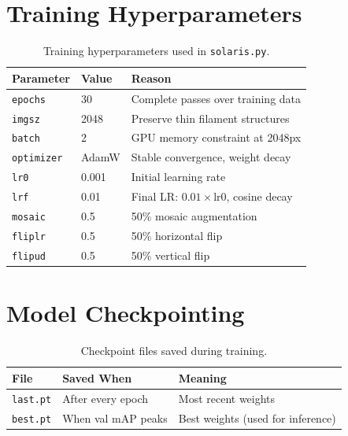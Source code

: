 \documentclass[12pt,a4paper,openany]{report}
\begin{document}
\section{Training Hyperparameters}

\begin{table}[H]
\centering
\caption{Training hyperparameters used in \texttt{solaris.py}.}
\renewcommand{\arraystretch}{1.3}
\begin{tabular}{l l p{7cm}}
\toprule
\textbf{Parameter} & \textbf{Value} & \textbf{Reason} \\
\midrule
\texttt{epochs}    & 30    & Complete passes over training data \\
\texttt{imgsz}     & 2048  & Preserve thin filament structures \\
\texttt{batch}     & 2     & GPU memory constraint at 2048px \\
\texttt{optimizer} & AdamW & Stable convergence, weight decay \\
\texttt{lr0}       & 0.001 & Initial learning rate \\
\texttt{lrf}       & 0.01  & Final LR: $0.01\times$lr0, cosine decay \\
\texttt{mosaic}    & 0.5   & 50\% mosaic augmentation \\
\texttt{fliplr}    & 0.5   & 50\% horizontal flip \\
\texttt{flipud}    & 0.5   & 50\% vertical flip \\
\bottomrule
\end{tabular}
\label{tab:hyperparam}
\end{table}

\section{Model Checkpointing}

\begin{table}[H]
\centering
\caption{Checkpoint files saved during training.}
\renewcommand{\arraystretch}{1.3}
\begin{tabular}{l l p{7cm}}
\toprule
\textbf{File} & \textbf{Saved When} & \textbf{Meaning} \\
\midrule
\texttt{last.pt} & After every epoch  & Most recent weights \\
\texttt{best.pt} & When val mAP peaks & Best weights (used for inference) \\
\bottomrule
\end{tabular}
\label{tab:checkpoint}
\end{table}
\end{document}
